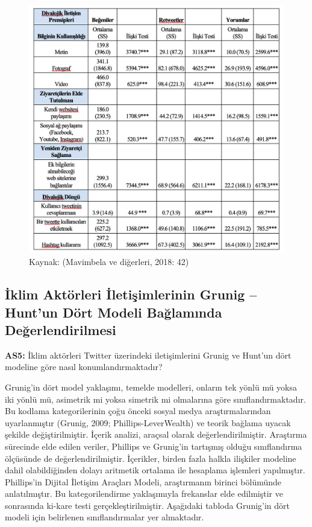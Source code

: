 \documentclass[
]{book}
\begin{document}
\begin{figure}
\includegraphics[width=0.95\linewidth,height=0.95\textheight]{tablolar-sekiller/tablo-4-5} \caption{Kaynak: (Mavimbela ve diğerleri, 2018: 42)}\label{fig:unnamed-chunk-9}
\end{figure}

\hypertarget{iklim-aktuxf6rleri-iletiux15fimlerinin-grunig-huntun-duxf6rt-modeli-baux11flamux131nda-deux11ferlendirilmesi}{%
\subsection{İklim Aktörleri İletişimlerinin Grunig -- Hunt'un Dört Modeli Bağlamında Değerlendirilmesi}\label{iklim-aktuxf6rleri-iletiux15fimlerinin-grunig-huntun-duxf6rt-modeli-baux11flamux131nda-deux11ferlendirilmesi}}

\textbf{AS5:} İklim aktörleri Twitter üzerindeki iletişimlerini Grunig ve Hunt'un dört modeline göre nasıl konumlandırmaktadır?

Grunig'in dört model yaklaşımı, temelde modelleri, onların tek yönlü mü yoksa iki yönlü mü, asimetrik mi yoksa simetrik mi olmalarına göre sınıflandırmaktadır. Bu kodlama kategorilerinin çoğu önceki sosyal medya araştırmalarından uyarlanmıştır (Grunig, 2009; Phillips-LeverWealth) ve teorik bağlama uyacak şekilde değiştirilmiştir. İçerik analizi, araçsal olarak değerlendirilmiştir. Araştırma sürecinde elde edilen veriler, Phillips ve Grunig'in tartışmış olduğu sınıflandırma ölçüsünde de değerlendirilmiştir. İçerikler, birden fazla halkla ilişkiler modeline dahil olabildiğinden dolayı aritmetik ortalama ile hesaplama işlemleri yapılmıştır. Phillips'in Dijital İletişim Araçları Modeli, araştırmanın birinci bölümünde anlatılmıştır. Bu kategorilendirme yaklaşımıyla frekanslar elde edilmiştir ve sonrasında ki-kare testi gerçekleştirilmiştir. Aşağıdaki tabloda Grunig'in dört modeli için belirlenen sınıflandırmalar yer almaktadır.
\end{document}
